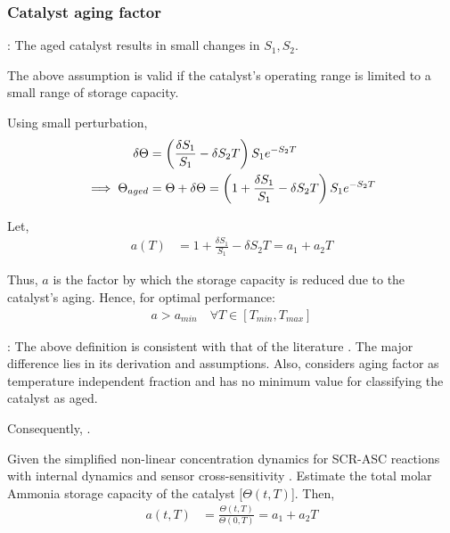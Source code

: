 \subsubsection{Catalyst aging factor}

: The aged catalyst results in small changes in
$S_1, S_2$.

The above assumption is valid if the catalyst's operating range is limited to a
small range of storage capacity.

Using small perturbation,
\begin{align*}
    \delta \Theta &= \left( \frac{\delta S_1}{S_1} - \delta S_2T \right) S_1 e^{-S_2 T}\\
    \implies \Theta_{aged} &= \Theta + \delta \Theta = \left( 1 + \frac{\delta S_1}{S_1} - \delta S_2T \right) S_1 e^{-S_2 T}
\end{align*}

Let,
\begin{align*}
    a(T) &= 1 + \frac{\delta S_1}{S_1} - \delta S_2T = a_1 + a_2 T
\end{align*}

Thus, $a$ is the factor by which the storage capacity is reduced due to the
catalyst's aging. Hence, for optimal performance:
\begin{align*}
    a > a_{min} \quad \forall T \in [T_{min}, T_{max}]
\end{align*}

: The above definition is consistent with that of the literature
\cite{ma2017observer}. The major difference lies in its derivation and
assumptions. Also, \cite{ma2017observer} considers aging factor as temperature
independent fraction and has no minimum value for classifying the catalyst as aged.

Consequently, .\\



Given the simplified non-linear concentration dynamics for SCR-ASC
reactions with internal dynamics and sensor cross-sensitivity
\cred{(\ref{eqn::full_nonlinear})}. Estimate the total molar
Ammonia storage capacity of the catalyst [$\Theta(t, T)$]. Then,
\begin{align*}
    a(t, T) &= \frac{\Theta(t, T)}{\Theta(0, T)} = a_1 + a_2 T
\end{align*}


